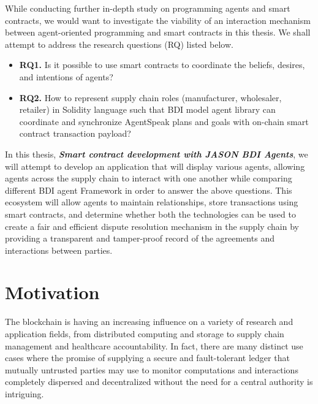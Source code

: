 \vspace{.5cm}
While conducting further in-depth study on programming agents and smart contracts, we would want to investigate the viability of an interaction mechanism between agent-oriented programming and smart contracts in this thesis. We shall attempt to address the research questions (RQ) listed below.
\begin{itemize}[label={}]

\item \textbf{RQ1.} Is it possible to use smart contracts to coordinate the beliefs, desires, and intentions of agents? \\

 \item \textbf{RQ2.} How to represent supply chain roles (manufacturer, wholesaler, retailer) in Solidity language such that \ac{BDI} model agent library can coordinate and synchronize AgentSpeak plans and goals with on-chain smart contract transaction payload? \\
 
 
\end{itemize}

In this thesis, \textbf{\textit{Smart contract development with JASON \ac{BDI} Agents}}, we will attempt to develop an application that will display various agents, allowing agents across the supply chain to interact with one another while comparing different \ac{BDI} agent Framework in order to answer the above questions. This ecosystem will allow agents to maintain relationships, store transactions using smart contracts, and determine whether both the technologies can be used to create a fair and efficient dispute resolution mechanism in the supply chain by providing a transparent and tamper-proof record of the agreements and interactions between parties.

\section{Motivation}

The blockchain is having an increasing influence on a variety of research and application fields, from distributed computing and storage to supply chain management and healthcare accountability. In fact, there are many distinct use cases where the promise of supplying a secure and fault-tolerant ledger that mutually untrusted parties may use to monitor computations and interactions completely dispersed and decentralized without the need for a central authority is intriguing. 

